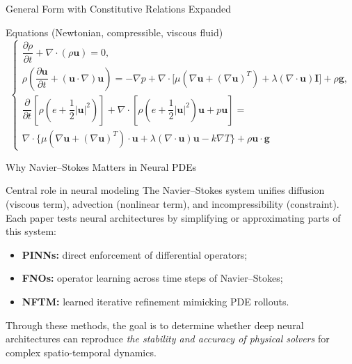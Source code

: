 \begin{secframe}
\small
\textcolor{red_unipd}{\Large General Form with Constitutive Relations Expanded}

\vspace{0.6em}

\begin{alertblock}{Equations (Newtonian, compressible, viscous fluid)}
\[
\begin{cases}
\dfrac{\partial \rho}{\partial t}
+ \nabla\!\cdot\!(\rho \mathbf{u}) = 0,\\[16pt]

\rho\!\left(
\dfrac{\partial \mathbf{u}}{\partial t}
+ (\mathbf{u}\!\cdot\!\nabla)\mathbf{u}
\right)
= -\nabla p
+ \nabla\!\cdot\!\Big[
\mu\!\left(\nabla \mathbf{u} + (\nabla \mathbf{u})^T\right)
+ \lambda (\nabla\!\cdot\!\mathbf{u})\mathbf{I}
\Big]
+ \rho \mathbf{g},\\[20pt]

\dfrac{\partial }{\partial t}\!
\left[\rho\!\left(e + \dfrac{1}{2}|\mathbf{u}|^2\right)\right]
+ \nabla\!\cdot\!
\left[\rho\!\left(e + \dfrac{1}{2}|\mathbf{u}|^2\right)\mathbf{u} + p\mathbf{u}\right]
= \\ \nabla\!\cdot\!
\Big\{
\mu\!\left(\nabla \mathbf{u} + (\nabla \mathbf{u})^T\right)\!\cdot\!\mathbf{u}
+ \lambda (\nabla\!\cdot\!\mathbf{u})\mathbf{u}
- k\nabla T
\Big\}
+ \rho \mathbf{u}\!\cdot\!\mathbf{g}
\end{cases}
\]
\end{alertblock}

\end{secframe}




\begin{secframe}
\small
\textcolor{red_unipd}{\Large Why Navier--Stokes Matters in Neural PDEs}

\vspace{0.6em}

\begin{block}{Central role in neural modeling}
The Navier--Stokes system unifies diffusion (viscous term),  
advection (nonlinear term), and incompressibility (constraint).  
Each paper tests neural architectures by simplifying or approximating parts of this system:
\begin{itemize}
  \item \textbf{PINNs:} direct enforcement of differential operators;
  \item \textbf{FNOs:} operator learning across time steps of Navier–Stokes;
  \item \textbf{NFTM:} learned iterative refinement mimicking PDE rollouts.
\end{itemize}
\vspace{0.4em}
Through these methods, the goal is to determine whether deep neural architectures can reproduce  
\textit{the stability and accuracy of physical solvers} for complex spatio-temporal dynamics.
\end{block}
\end{secframe}

